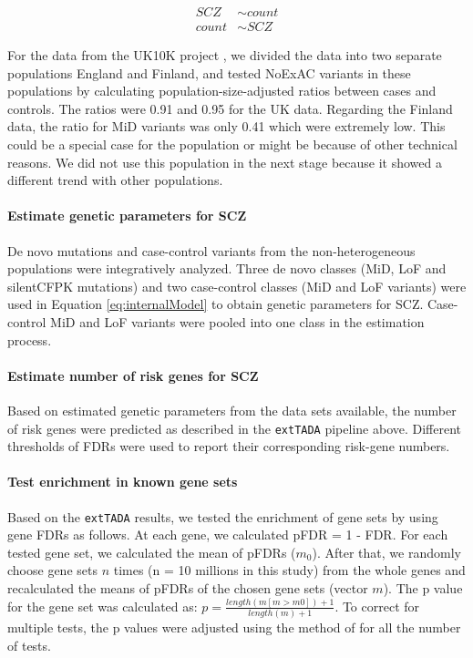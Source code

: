 \documentclass[]{article}
\begin{document}
\begin{equation} \label{eq:LMandGLMnotAdjustment}
\begin{array}{ll}
SCZ & \sim count \\
count & \sim SCZ
\end{array}
\end{equation}

For the data from the UK10K project
\citep{singh2016rare}, we divided the data into two separate
populations England and Finland, and tested NoExAC variants in these
populations by calculating population-size-adjusted ratios between cases
and controls. The ratios were 0.91 and 0.95 for the UK data.
Regarding the Finland data, the ratio for MiD variants was only 0.41 which were
extremely low. This could be a special case for the population or might
be because of other technical reasons. We did not use this population in
the next stage because it showed a different trend with other populations.

\paragraph{Estimate genetic parameters for SCZ}

De novo mutations and case-control variants from the non-heterogeneous
populations were integratively analyzed. Three de novo classes (MiD,
LoF and silentCFPK mutations) and two case-control classes (MiD and
LoF variants) were used in Equation \ref{eq:internalModel} to obtain
genetic parameters for SCZ. Case-control MiD and LoF variants were
pooled into one class in the estimation process.

\paragraph{Estimate number of risk genes for SCZ}

Based on estimated genetic parameters from the data sets available, the number of risk genes were
predicted as described in the \texttt{extTADA} pipeline above. Different thresholds of FDRs were used to
report their corresponding risk-gene numbers.

\paragraph{Test enrichment in known gene sets}

Based on the \texttt{extTADA} results, we tested the enrichment of
gene sets by using gene FDRs as
follows. At each gene, we calculated pFDR = 1 - FDR. For each tested gene set, we calculated the mean of pFDRs
 ($m_0$). After that, we randomly choose gene sets $n$ times (n =
10 millions in this study) from the whole genes and
recalculated the means of pFDRs of the chosen gene sets (vector $m$). The p
value for the gene set was calculated as: $p = \frac{length(m[m > m0])
+ 1}{length(m) + 1}$. To correct for multiple tests, the p
values were adjusted using the method of
\cite{benjamini1995controlling} for all the number of tests.
\end{document}

